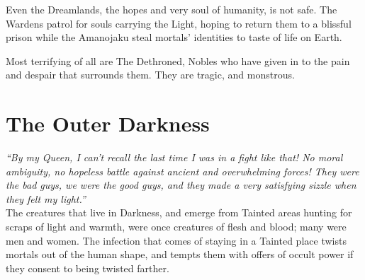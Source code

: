 Even the Dreamlands, the hopes and very soul of humanity, is not safe. The Wardens patrol for souls carrying the Light, hoping to return them to a blissful prison while the Amanojaku steal mortals' identities to taste of life on Earth. 

Most terrifying of all are The Dethroned, Nobles who have given in to the pain and despair that surrounds them. They are tragic, and monstrous.


\section*{The Outer Darkness}

\textit{\textquotedblleft By my Queen, I can't recall the last time I was in a fight like that! No moral ambiguity, no hopeless battle against ancient and overwhelming forces! They were the bad guys, we were the good guys, and they made a very satisfying sizzle when they felt my light.\textquotedblright}\\

\noindent The creatures that live in Darkness, and emerge from Tainted areas hunting for scraps of light and warmth, were once creatures of flesh and blood; many were men and women. The infection that comes of staying in a Tainted place twists mortals out of the human shape, and tempts them with offers of occult power if they consent to being twisted farther. 

